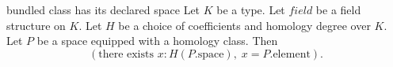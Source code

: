 \begin{cleanresult}{bundled class has its declared space}
Let $K$ be a type.
Let $\mathit{field}$ be a field structure on $K$.
Let $H$ be a choice of coefficients and homology degree over $K$.
Let $P$ be a space equipped with a homology class.
Then \[\left(\text{there exists }x : H(P.\mathrm{space}),\; x=P.\mathrm{element}\right).\]
\end{cleanresult}

